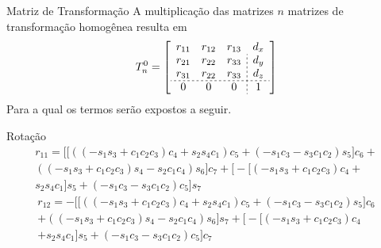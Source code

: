 \begin{frame}{Matriz de Transformação}
A multiplicação das matrizes $n$ matrizes de transformação homogênea resulta em
\begin{equation}
    T_{n}^0 =
    \left[
    \begin{array}{ccc;{2pt/2pt}c}
        r_{11} & r_{12} & r_{13} & d_x \\
        r_{21} & r_{22} & r_{33} & d_y \\
        r_{31} & r_{22} & r_{33} & d_z \\        \hdashline[2pt/2pt]
             0 &      0 &      0 &    1
    \end{array}
    \right]
\end{equation}
Para a qual os termos serão expostos a seguir.
\end{frame}
\begingroup
\footnotesize
\begin{frame}{Rotação}
\begin{multline*}
    r_{11} =
    \Bigg[\Big[ \left(\left(- s_1 s_3 + c_1 c_2 c_3\right) c_4 + s_2 s_4 c_1\right) c_5 + \left(- s_1 c_3 - s_3 c_1 c_2\right) s_5 \Big] c_6 + \\
    \left(\left(- s_1 s_3 + c_1 c_2 c_3\right) s_4 - s_2 c_1 c_4\right) s_6\Bigg] c_7 + \Bigg[- \Big[\left(- s_1 s_3 + c_1 c_2 c_3\right) c_4 + \\
    s_2 s_4 c_1\Big] s_5 + \left(- s_1 c_3 - s_3 c_1 c_2\right) c_5\Bigg] s_7
\end{multline*}
\begin{multline*}
    r_{12} = - \Bigg[\Big[\left(\left(- s_1 s_3 + c_1 c_2 c_3\right) c_4 + s_2 s_4 c_1\right) c_5 + \left(- s_1 c_3 - s_3 c_1 c_2\right) s_5\Big] c_6 \\
    + \left(\left(- s_1 s_3 + c_1 c_2 c_3\right) s_4 - s_2 c_1 c_4\right) s_6\Bigg] s_7 + \Bigg[- \Big[\left(- s_1 s_3 + c_1 c_2 c_3\right) c_4 \\
    + s_2 s_4 c_1\Big] s_5 + \left(- s_1 c_3 - s_3 c_1 c_2\right) c_5\Bigg] c_7
\end{multline*}
\end{frame}

